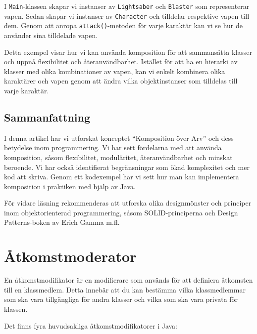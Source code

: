 I \texttt{Main}-klassen skapar vi instanser av \texttt{Lightsaber} och
\texttt{Blaster} som representerar vapen. Sedan skapar vi instanser av
\texttt{Character} och tilldelar respektive vapen till dem. Genom att
anropa \texttt{attack()}-metoden för varje karaktär kan vi se hur de
använder sina tilldelade vapen.

Detta exempel visar hur vi kan använda komposition för att sammansätta
klasser och uppnå flexibilitet och återanvändbarhet. Istället för att ha
en hierarki av klasser med olika kombinationer av vapen, kan vi enkelt
kombinera olika karaktärer och vapen genom att ändra vilka
objektinstanser som tilldelas till varje karaktär.

\hypertarget{sammanfattning}{%
\subsection{Sammanfattning}\label{sammanfattning}}

I denna artikel har vi utforskat konceptet ``Komposition över Arv'' och
dess betydelse inom programmering. Vi har sett fördelarna med att
använda komposition, såsom flexibilitet, moduläritet, återanvändbarhet
och minskat beroende. Vi har också identifierat begränsningar som ökad
komplexitet och mer kod att skriva. Genom ett kodexempel har vi sett hur
man kan implementera komposition i praktiken med hjälp av Java.

För vidare läsning rekommenderas att utforska olika designmönster och
principer inom objektorienterad programmering, såsom SOLID-principerna
och Design Patterns-boken av Erich Gamma m.fl.

\hypertarget{uxe5tkomstmoderator}{%
\section{Åtkomstmoderator}\label{uxe5tkomstmoderator}}

En åtkomstmodifikator är en modifierare som används för att definiera
åtkomsten till en klassmedlem. Detta innebär att du kan bestämma vilka
klassmedlemmar som ska vara tillgängliga för andra klasser och vilka som
ska vara privata för klassen.

Det finns fyra huvudsakliga åtkomstmodifikatorer i Java:

